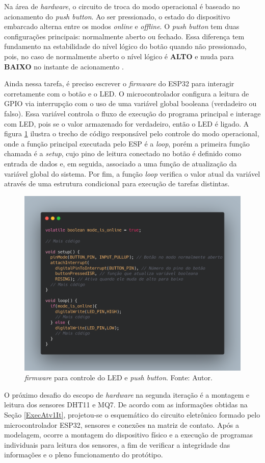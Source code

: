 Na área de \textit{hardware}, o circuito de troca do modo operacional é baseado no acionamento do \textit{push button}. Ao ser 
pressionado, o estado do dispositivo embarcado alterna entre os modos \textit{online} e \textit{offline}. O \textit{push button} 
tem duas configurações principais: normalmente aberto ou fechado. Essa diferença tem fundamento na estabilidade do nível lógico do botão 
quando não pressionado, pois, no caso de normalmente aberto o nível lógico é \textbf{ALTO} e muda para \textbf{BAIXO} no instante de acionamento \cite{arduino-docs}.

Ainda nessa tarefa, é preciso escrever o \textit{firmware} do ESP32 para interagir corretamente com o botão e o LED. O microcontrolador configura a 
leitura de GPIO via interrupção com o uso de uma variável global booleana (verdadeiro ou falso). Essa variável controla o fluxo de execução do programa principal 
e interage com LED, pois se o valor armazenado for verdadeiro, então o LED é ligado. A figura \ref{figPushButtonFirmware} ilustra o trecho de código responsável pelo controle do modo operacional, onde a função principal 
executada pelo ESP é a \textit{loop}, porém a primeira função chamada é a \textit{setup}, cujo pino de leitura conectado 
no botão é definido como entrada de dados e, em seguida, associado a uma função de atualização da variável global do sistema. Por fim, a função \textit{loop} 
verifica o valor atual da variável através de uma estrutura condicional para execução de tarefas distintas. 

\begin{figure}[ht]
    \centering
    \includegraphics[width=.62\textwidth]{img/push-button-firrmware.png}
    \caption{\textit{firmware} para controle do LED e \textit{push button}. Fonte: Autor.}\label{figPushButtonFirmware}
\end{figure}

O próximo desafio do escopo de \textit{hardware} na segunda iteração é a montagem e leitura dos sensores DHT11 e MQ7. De acordo 
com as informações obtidas na Seção \ref{ExecAtv1It}, projetou-se o esquemático do circuito eletrônico formado pelo microcontrolador ESP32, sensores e conexões na matriz de contato. 
Após a modelagem, ocorre a montagem do dispositivo físico e a execução de programas individuais para leitura dos sensores, a fim de verificar a 
integridade das informações e o pleno funcionamento do protótipo.


